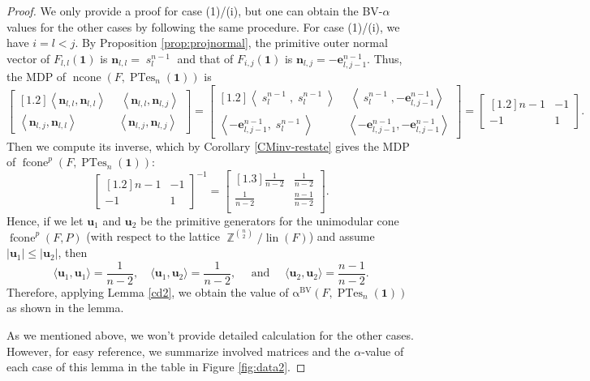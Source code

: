 \documentclass[12pt]{amsart}
\numberwithin{equation}{section}
\theoremstyle{definition}
\def\ptes{\operatorname{PTes}}
\def\fcone{\operatorname{fcone}}
\def\ncone{\operatorname{ncone}}
\def\lin{\operatorname{lin}}
\def\1{{\boldsymbol{1}}}
\def\be{{\boldsymbol{e}}}
\def\bn{\boldsymbol{n}}
\def\bu{\boldsymbol{u}}
\def\bvalpha{\operatorname{\alpha^{BV}}}
\def\sm{\boldsymbol{\operatorname{\mathit{s}}}}
\def\Z{\operatorname{\mathbb{Z}}}
\begin{document}
\begin{proof}
  We only provide a proof for case (1)/(i), but one can obtain the BV-$\alpha$ values for the other cases by following the same procedure. For case (1)/(i), we have $i=l<j$. By Proposition \ref{prop:projnormal}, the primitive outer normal vector of $F_{l,l}(\1)$ is $\bn_{l,l}=\sm^{n-1}_{l}$ and that of $F_{i,j}(\1)$ is $\bn_{l,j} = -\be^{n-1}_{l,j-1}$. Thus, the MDP of $\ncone(F, \ptes_n(\boldsymbol{1}))$ is
	\[\begin{bmatrix}[1.2]
	    \left\langle \bn_{l,l}, \bn_{l,l} \right\rangle \ & \ \left\langle \bn_{l,l}, \bn_{l,j} \right\rangle \\
	    \left\langle \bn_{l,j}, \bn_{l,l} \right\rangle &  \left\langle \bn_{l,j}, \bn_{l,j} \right\rangle 
\end{bmatrix}
=
	  \begin{bmatrix}[1.2]
\left\langle \sm^{n-1}_{l}, \sm^{n-1}_{l} \right\rangle \ & \ \left\langle \sm^{n-1}_{l}, -\be^{n-1}_{l,j-1} \right\rangle \\
\left\langle -\be^{n-1}_{l,j-1}, \sm^{n-1}_{l} \right\rangle &  \left\langle -\be^{n-1}_{l,j-1}, -\be^{n-1}_{l,j-1} \right\rangle 
\end{bmatrix} = \begin{bmatrix}[1.2]
 n-1 & -1 \\
 -1 & 1 
\end{bmatrix}.\]
Then we compute its inverse, which by Corollary \ref{CMinv-restate} gives the MDP of $\fcone^p(F, \ptes_n(\boldsymbol{1}))$:
\[ \begin{bmatrix}[1.2]
 n-1 & -1 \\
 -1 & 1 
\end{bmatrix}^{-1} = \begin{bmatrix}[1.3] 
    \frac{1}{n-2} & \frac{1}{n-2} \\[1mm]
    \frac{1}{n-2} & \frac{n-1}{n-2} \\[1mm]
\end{bmatrix}.\]
Hence, if we let $\bu_1$ and $\bu_2$ be the primitive generators for the unimodular cone $\fcone^{p}(F,P)$ (with respect to the lattice $\Z^{\binom{n}{2}}/\lin(F)$) and assume $|\bu_1| \le |\bu_2|$, then  
\[\langle \bu_{1}, \bu_{1} \rangle = \dfrac{1}{n-2}, \quad  \langle \bu_{1}, \bu_{2} \rangle = \dfrac{1}{n-2},  \quad \text{ and } \quad \langle \bu_{2}, \bu_{2} \rangle = \dfrac{n-1}{n-2}.\]
Therefore, applying Lemma \ref{cd2}, we obtain the value of $\bvalpha(F,\ptes_{n}(\boldsymbol{1}))$ as shown in the lemma. 

As we mentioned above, we won't provide detailed calculation for the other cases. However, for easy reference, we summarize involved matrices and the $\alpha$-value of each case of this lemma in the table in Figure \ref{fig:data2}. 
\end{proof}
\end{document}
